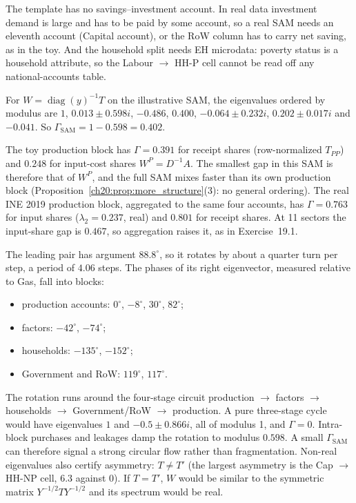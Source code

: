 \documentclass[../solutions_manual.tex]{subfiles}
\begin{document}
 The template has no savings--investment account. In real data investment demand is large and has to be paid by some account, so a real SAM needs an eleventh account (Capital account), or the RoW column has to carry net saving, as in the toy. And the household split needs EH microdata: poverty status is a household attribute, so the Labour $\to$ HH-P cell cannot be read off any national-accounts table.


 For $W = \operatorname{diag}(y)^{-1}T$ on the illustrative SAM, the eigenvalues ordered by modulus are $1$, $0.013 \pm 0.598i$, $-0.486$, $0.400$, $-0.064 \pm 0.232i$, $0.202 \pm 0.017i$ and $-0.041$. So $\Gamma_{\text{SAM}} = 1 - 0.598 = 0.402$.

 The toy production block has $\Gamma = 0.391$ for receipt shares (row-normalized $T_{PP}$) and $0.248$ for input-cost shares $W^P = D^{-1}A$. The smallest gap in this SAM is therefore that of $W^P$, and the full SAM mixes faster than its own production block (Proposition~\ref{ch20:prop:more_structure}(3): no general ordering). The real INE 2019 production block, aggregated to the same four accounts, has $\Gamma = 0.763$ for input shares ($\lambda_2 = 0.237$, real) and $0.801$ for receipt shares. At 11 sectors the input-share gap is $0.467$, so aggregation raises it, as in Exercise~19.1.

 The leading pair has argument $88.8^\circ$, so it rotates by about a quarter turn per step, a period of $4.06$ steps. The phases of its right eigenvector, measured relative to Gas, fall into blocks:
\begin{itemize}
\item production accounts: $0^\circ$, $-8^\circ$, $30^\circ$, $82^\circ$;
\item factors: $-42^\circ$, $-74^\circ$;
\item households: $-135^\circ$, $-152^\circ$;
\item Government and RoW: $119^\circ$, $117^\circ$.
\end{itemize}
The rotation runs around the four-stage circuit production $\to$ factors $\to$ households $\to$ Government/RoW $\to$ production. A pure three-stage cycle would have eigenvalues $1$ and $-0.5 \pm 0.866i$, all of modulus 1, and $\Gamma = 0$. Intra-block purchases and leakages damp the rotation to modulus $0.598$. A small $\Gamma_{\text{SAM}}$ can therefore signal a strong circular flow rather than fragmentation. Non-real eigenvalues also certify asymmetry: $T \ne T'$ (the largest asymmetry is the Cap $\to$ HH-NP cell, $6.3$ against $0$). If $T = T'$, $W$ would be similar to the symmetric matrix $Y^{-1/2}TY^{-1/2}$ and its spectrum would be real.
\end{document}
